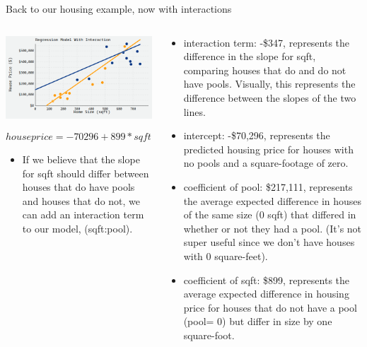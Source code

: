 \documentclass[australian,ignorenonframetext,aspectratio=169]{beamer}
\providecommand{\tightlist}{%
  \setlength{\itemsep}{0pt}\setlength{\parskip}{0pt}}
\begin{document}
\begin{frame}{Back to our housing example, now with interactions}
\protect\hypertarget{back-to-our-housing-example-now-with-interactions}{}

\begin{columns}[T]
\begin{column}{0.5\textwidth}
\begin{center}\includegraphics[width=1\linewidth]{../graphs/interpret-4} \end{center}

\tiny

\[house price=-70296+899*sqft+217111*pool-347*(sqft:pool)\]

\begin{itemize}
\tightlist
\item
  If we believe that the slope for sqft should differ between houses
  that do have pools and houses that do not, we can add an interaction
  term to our model, (sqft:pool).
\end{itemize}
\end{column}

\begin{column}{0.5\textwidth}
\tiny

\begin{itemize}
\item
  interaction term: -\$347, represents the difference in the slope for
  sqft, comparing houses that do and do not have pools. Visually, this
  represents the difference between the slopes of the two lines.
\item
  intercept: -\$70,296, represents the predicted housing price for
  houses with no pools and a square-footage of zero.
\item
  coefficient of pool: \$217,111, represents the average expected
  difference in houses of the same size (0 sqft) that differed in
  whether or not they had a pool. (It's not super useful since we don't
  have houses with 0 square-feet).
\item
  coefficient of sqft: \$899, represents the average expected difference
  in housing price for houses that do not have a pool (pool= 0) but
  differ in size by one square-foot.
\end{itemize}
\end{column}
\end{columns}

\end{frame}
\end{document}
